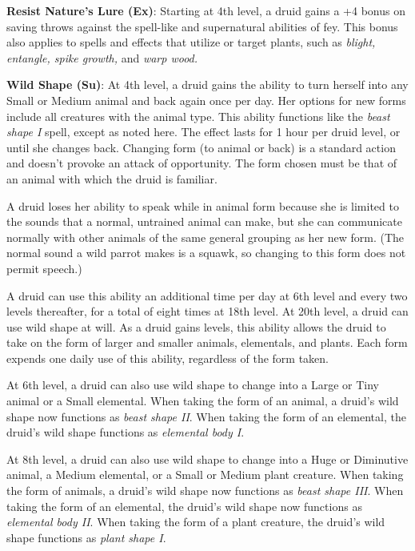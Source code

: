 \textbf{Resist Nature's Lure (Ex)}: Starting at 4th level, a druid gains a +4 bonus on saving throws against the spell-like and supernatural abilities of fey. This bonus also applies to spells and effects that utilize or target plants, such as \textit{blight, entangle, spike growth, }and \textit{warp wood.}
				
\textbf{Wild Shape (Su)}: At 4th level, a druid gains the ability to turn herself into any Small or Medium animal and back again once per day. Her options for new forms include all creatures with the animal type. This ability functions like the \textit{beast shape I} spell, except as noted here. The effect lasts for 1 hour per druid level, or until she changes back. Changing form (to animal or back) is a standard action and doesn't provoke an attack of opportunity. The form chosen must be that of an animal with which the druid is familiar. 
				
A druid loses her ability to speak while in animal form because she is limited to the sounds that a normal, untrained animal can make, but she can communicate normally with other animals of the same general grouping as her new form. (The normal sound a wild parrot makes is a squawk, so changing to this form does not permit speech.)
				
A druid can use this ability an additional time per day at 6th level and every two levels thereafter, for a total of eight times at 18th level. At 20th level, a druid can use wild shape at will. As a druid gains levels, this ability allows the druid to take on the form of larger and smaller animals, elementals, and plants. Each form expends one daily use of this ability, regardless of the form taken. 
				
At 6th level, a druid can also use wild shape to change into a Large or Tiny animal or a Small elemental. When taking the form of an animal, a druid's wild shape now functions as \textit{beast shape II}. When taking the form of an elemental, the druid's wild shape functions as \textit{elemental body I}.
				
At 8th level, a druid can also use wild shape to change into a Huge or Diminutive animal, a Medium elemental, or a Small or Medium plant creature. When taking the form of animals, a druid's wild shape now functions as \textit{beast shape III}. When taking the form of an elemental, the druid's wild shape now functions as \textit{elemental body II}. When taking the form of a plant creature, the druid's wild shape functions as \textit{plant shape I}.
				
